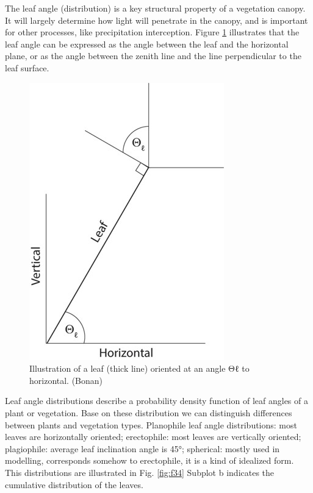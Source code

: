 \documentclass[12pt,oneside]{book}
\begin{document}
The leaf angle (distribution) is a key structural property of a
vegetation canopy. It will largely determine how light will penetrate in
the canopy, and is important for other processes, like precipitation
interception. Figure \ref{fig:f33} illustrates that the leaf angle can
be expressed as the angle between the leaf and the horizontal plane, or
as the angle between the zenith line and the line perpendicular to the
leaf surface.

\begin{figure}

{\centering \includegraphics[width=0.8\linewidth]{figures/chap3/f33_Langle} 

}

\caption{Illustration of a leaf (thick line) oriented at an angle Θℓ to horizontal. (Bonan)}\label{fig:f33}
\end{figure}

Leaf angle distributions describe a probability density function of leaf
angles of a plant or vegetation. Base on these distribution we can
distinguish differences between plants and vegetation types. Planophile
leaf angle distributions: most leaves are horizontally oriented;
erectophile: most leaves are vertically oriented; plagiophile: average
leaf inclination angle is 45°; spherical: mostly used in modelling,
corresponds somehow to erectophile, it is a kind of idealized form. This
distributions are illustrated in Fig. \ref{fig:f34} Subplot b indicates
the cumulative distribution of the leaves.
\end{document}
